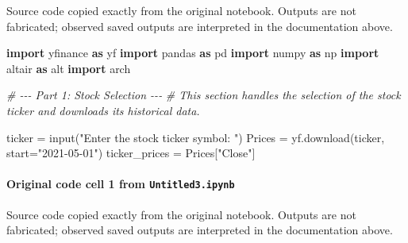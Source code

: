 \documentclass[
  11pt,
]{article}
\newenvironment{Shaded}{}{}
\newcommand{\BuiltInTok}[1]{\textcolor[rgb]{0.00,0.50,0.00}{#1}}
\newcommand{\CommentTok}[1]{\textcolor[rgb]{0.38,0.63,0.69}{\textit{#1}}}
\newcommand{\ImportTok}[1]{\textcolor[rgb]{0.00,0.50,0.00}{\textbf{#1}}}
\newcommand{\NormalTok}[1]{#1}
\newcommand{\OperatorTok}[1]{\textcolor[rgb]{0.40,0.40,0.40}{#1}}
\newcommand{\StringTok}[1]{\textcolor[rgb]{0.25,0.44,0.63}{#1}}
\begin{document}
Source code copied exactly from the original notebook. Outputs are not fabricated; observed saved outputs are interpreted in the documentation above.

\begin{Shaded}
\begin{Highlighting}[]
\ImportTok{import}\NormalTok{ yfinance }\ImportTok{as}\NormalTok{ yf}
\ImportTok{import}\NormalTok{ pandas }\ImportTok{as}\NormalTok{ pd}
\ImportTok{import}\NormalTok{ numpy }\ImportTok{as}\NormalTok{ np}
\ImportTok{import}\NormalTok{ altair }\ImportTok{as}\NormalTok{ alt}
\ImportTok{import}\NormalTok{ arch}

\CommentTok{\# {-}{-}{-} Part 1: Stock Selection {-}{-}{-}}
\CommentTok{\# This section handles the selection of the stock ticker and downloads its historical data.}

\NormalTok{ticker }\OperatorTok{=} \BuiltInTok{input}\NormalTok{(}\StringTok{"Enter the stock ticker symbol: "}\NormalTok{)}
\NormalTok{Prices }\OperatorTok{=}\NormalTok{ yf.download(ticker, start}\OperatorTok{=}\StringTok{"2021{-}05{-}01"}\NormalTok{)}
\NormalTok{ticker\_prices }\OperatorTok{=}\NormalTok{ Prices[}\StringTok{"Close"}\NormalTok{]}

\end{Highlighting}
\end{Shaded}

\paragraph{\texorpdfstring{Original code cell 1 from \texttt{Untitled3.ipynb}}{Original code cell 1 from Untitled3.ipynb}}\label{original-code-cell-1-from-untitled3ipynb}

Source code copied exactly from the original notebook. Outputs are not fabricated; observed saved outputs are interpreted in the documentation above.
\end{document}
